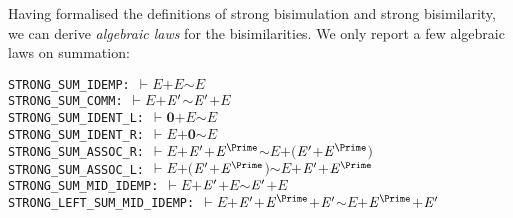 \documentclass[GCNS]{yincog}
\renewcommand{\HOLConst}[1]{\texttt{#1}}
\renewcommand{\HOLFreeVar}[1]{\ensuremath{\mathit{#1}}}
\renewcommand{\HOLSymConst}[1]{#1}
\renewcommand{\HOLTokenTurnstile}{\ensuremath{\:\:\vdash}}
\theoremstyle{remark}
\theoremstyle{theorem}
\theoremstyle{remark}
\newcommand{\HOLTokenStrongEQ}{$\sim$}
\begin{document}
Having formalised the definitions of strong bisimulation and strong bisimilarity,
we can derive \emph{algebraic laws} for the bisimilarities. We only report
a few algebraic laws on summation:
%
\begin{alltt}
STRONG\_SUM\_IDEMP:          \HOLTokenTurnstile{} \HOLFreeVar{E} \HOLSymConst{\ensuremath{+}} \HOLFreeVar{E} \HOLSymConst{\HOLTokenStrongEQ} \HOLFreeVar{E}
STRONG\_SUM\_COMM:           \HOLTokenTurnstile{} \HOLFreeVar{E} \HOLSymConst{\ensuremath{+}} \ensuremath{\HOLFreeVar{E}\sp{\prime}} \HOLSymConst{\HOLTokenStrongEQ} \ensuremath{\HOLFreeVar{E}\sp{\prime}} \HOLSymConst{\ensuremath{+}} \HOLFreeVar{E}
STRONG\_SUM\_IDENT\_L:        \HOLTokenTurnstile{} \HOLConst{\ensuremath{\mathbf{0}}} \HOLSymConst{\ensuremath{+}} \HOLFreeVar{E} \HOLSymConst{\HOLTokenStrongEQ} \HOLFreeVar{E}
STRONG\_SUM\_IDENT\_R:        \HOLTokenTurnstile{} \HOLFreeVar{E} \HOLSymConst{\ensuremath{+}} \HOLConst{\ensuremath{\mathbf{0}}} \HOLSymConst{\HOLTokenStrongEQ} \HOLFreeVar{E}
STRONG\_SUM\_ASSOC\_R:        \HOLTokenTurnstile{} \HOLFreeVar{E} \HOLSymConst{\ensuremath{+}} \ensuremath{\HOLFreeVar{E}\sp{\prime}} \HOLSymConst{\ensuremath{+}} \ensuremath{\HOLFreeVar{E}\sp{\Prime}} \HOLSymConst{\HOLTokenStrongEQ} \HOLFreeVar{E} \HOLSymConst{\ensuremath{+}} \ensuremath{(}\ensuremath{\HOLFreeVar{E}\sp{\prime}} \HOLSymConst{\ensuremath{+}} \ensuremath{\HOLFreeVar{E}\sp{\Prime}}\ensuremath{)}
STRONG\_SUM\_ASSOC\_L:        \HOLTokenTurnstile{} \HOLFreeVar{E} \HOLSymConst{\ensuremath{+}} \ensuremath{(}\ensuremath{\HOLFreeVar{E}\sp{\prime}} \HOLSymConst{\ensuremath{+}} \ensuremath{\HOLFreeVar{E}\sp{\Prime}}\ensuremath{)} \HOLSymConst{\HOLTokenStrongEQ} \HOLFreeVar{E} \HOLSymConst{\ensuremath{+}} \ensuremath{\HOLFreeVar{E}\sp{\prime}} \HOLSymConst{\ensuremath{+}} \ensuremath{\HOLFreeVar{E}\sp{\Prime}}
STRONG\_SUM\_MID\_IDEMP:      \HOLTokenTurnstile{} \HOLFreeVar{E} \HOLSymConst{\ensuremath{+}} \ensuremath{\HOLFreeVar{E}\sp{\prime}} \HOLSymConst{\ensuremath{+}} \HOLFreeVar{E} \HOLSymConst{\HOLTokenStrongEQ} \ensuremath{\HOLFreeVar{E}\sp{\prime}} \HOLSymConst{\ensuremath{+}} \HOLFreeVar{E}
STRONG\_LEFT\_SUM\_MID\_IDEMP: \HOLTokenTurnstile{} \HOLFreeVar{E} \HOLSymConst{\ensuremath{+}} \ensuremath{\HOLFreeVar{E}\sp{\prime}} \HOLSymConst{\ensuremath{+}} \ensuremath{\HOLFreeVar{E}\sp{\Prime}} \HOLSymConst{\ensuremath{+}} \ensuremath{\HOLFreeVar{E}\sp{\prime}} \HOLSymConst{\HOLTokenStrongEQ} \HOLFreeVar{E} \HOLSymConst{\ensuremath{+}} \ensuremath{\HOLFreeVar{E}\sp{\Prime}} \HOLSymConst{\ensuremath{+}} \ensuremath{\HOLFreeVar{E}\sp{\prime}}
\end{alltt}
\end{document}
